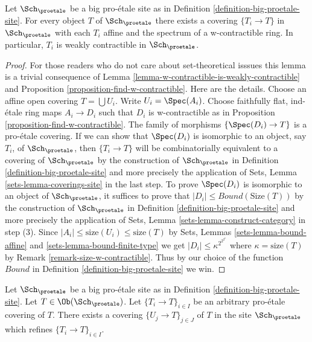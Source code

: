 \begin{lemma}
\label{lemma-get-many-weakly-contractible}
Let $\Sch_\proetale$ be a big pro-\'etale site as in
Definition \ref{definition-big-proetale-site}.
For every object $T$ of $\Sch_\proetale$ there exists
a covering $\{T_i \to T\}$ in $\Sch_\proetale$
with each $T_i$ affine and the spectrum of a w-contractible
ring. In particular, $T_i$ is weakly contractible in $\Sch_\proetale$.
\end{lemma}

\begin{proof}
For those readers who do not care about set-theoretical isssues
this lemma is a trivial consequence of
Lemma \ref{lemma-w-contractible-is-weakly-contractible} and
Proposition \ref{proposition-find-w-contractible}.
Here are the details.
Choose an affine open covering $T = \bigcup U_i$. Write $U_i = \Spec(A_i)$.
Choose faithfully flat, ind-\'etale ring maps $A_i \to D_i$
such that $D_i$ is w-contractible as in
Proposition \ref{proposition-find-w-contractible}.
The family of morphisms $\{\Spec(D_i) \to T\}$ is a
pro-\'etale covering.
If we can show that $\Spec(D_i)$ is isomorphic to an object, say $T_i$,
of $\Sch_\proetale$, then $\{T_i \to T\}$ will be combinatorially
equivalent to a covering of $\Sch_\proetale$ by the construction
of $\Sch_\proetale$ in Definition \ref{definition-big-proetale-site}
and more precisely the application of
Sets, Lemma \ref{sets-lemma-coverings-site} in the last step.
To prove $\Spec(D_i)$ is isomorphic to an object of
$\Sch_\proetale$, it suffices to prove that
$|D_i| \leq Bound(\text{Size}(T))$ by the construction
of $\Sch_\proetale$ in Definition \ref{definition-big-proetale-site}
and more precisely the application of
Sets, Lemma \ref{sets-lemma-construct-category} in step (3).
Since $|A_i| \leq \text{size}(U_i) \leq \text{size}(T)$
by Sets, Lemmas \ref{sets-lemma-bound-affine} and
\ref{sets-lemma-bound-finite-type} we get
$|D_i| \leq \kappa^{2^{2^{2^\kappa}}}$ where $\kappa = \text{size}(T)$
by Remark \ref{remark-size-w-contractible}.
Thus by our choice of the function $Bound$ in
Definition \ref{definition-big-proetale-site} we win.
\end{proof}

\begin{lemma}
\label{lemma-proetale-induced}
Let $\Sch_\proetale$ be a big pro-\'etale site as in
Definition \ref{definition-big-proetale-site}.
Let $T \in \Ob(\Sch_\proetale)$.
Let $\{T_i \to T\}_{i \in I}$ be an arbitrary pro-\'etale covering of $T$.
There exists a covering $\{U_j \to T\}_{j \in J}$ of $T$ in the site
$\Sch_\proetale$ which refines $\{T_i \to T\}_{i \in I}$.
\end{lemma}

